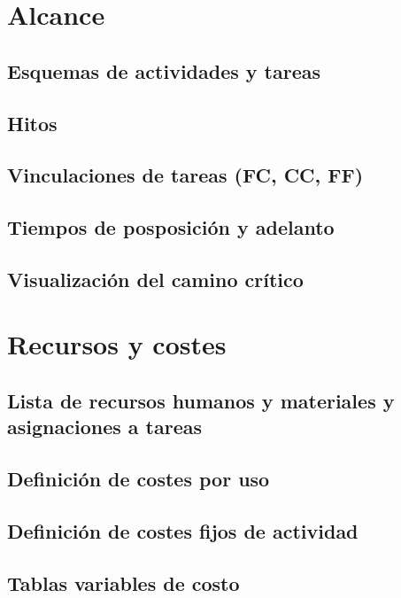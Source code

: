 \documentclass[11pt,a4paper,spanish,twoside]{report}
\begin{document}
\tableofcontents

\chapter{Alcance}
\section{Esquemas de actividades y tareas}

\section{Hitos}

\section{Vinculaciones de tareas (FC, CC, FF)}

\section{Tiempos de posposición y adelanto}

\section{Visualización del camino crítico}

\chapter{Recursos y costes}
\section{Lista de recursos humanos y materiales y asignaciones a 
  tareas}

\section{Definición de costes por uso}

\section{Definición de costes fijos de actividad}

\section{Tablas variables de costo}
\end{document}

